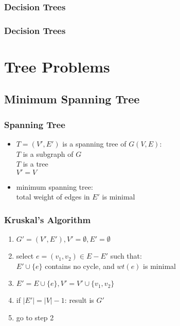 \documentclass[dvipsnames]{beamer}
\begin{document}
\begin{frame}
  \frametitle{Decision Trees}

  \begin{center}
  \end{center}
\end{frame}

\begin{frame}
  \frametitle{Decision Trees}

  \begin{center}
  \end{center}
\end{frame}


\section{Tree Problems}

\subsection{Minimum Spanning Tree}

\begin{frame}
  \frametitle{Spanning Tree}

  \begin{itemize}
    \item $T=(V',E')$ is a \alert{spanning tree} of $G(V,E)$:\\
      $T$ is a subgraph of $G$\\
      $T$ is a tree\\
      $V'=V$

    \medskip
    \item \alert{minimum spanning tree}:\\
      total weight of edges in $E'$ is minimal
  \end{itemize}
\end{frame}

\begin{frame}
  \frametitle{Kruskal's Algorithm}

  \begin{enumerate}
    \item $G'=(V',E'), V'=\emptyset, E'=\emptyset$
    \item select $e=(v_1,v_2) \in E-E'$ such that:\\
      $E' \cup \{e\}$ contains no cycle, and $wt(e)$ is minimal
    \item $E'=E \cup \{e\}, V'=V' \cup \{v_1,v_2\}$
    \item if $|E'|=|V|-1$: result is $G'$
    \item go to step 2
  \end{enumerate}
\end{frame}
\end{document}
